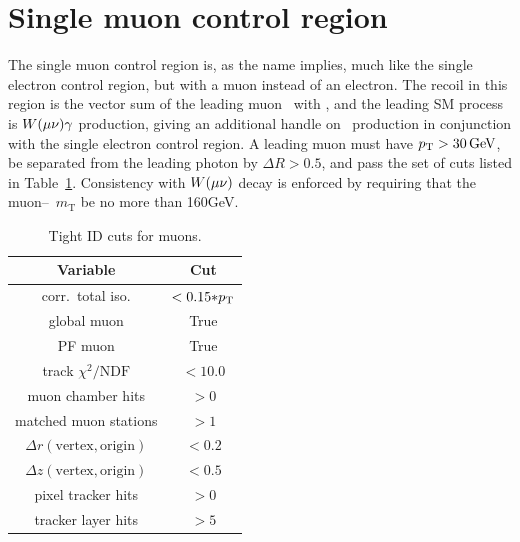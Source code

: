 \section{Single muon control region} \label{sec:event_selection_monomu}
The single muon control region is, as the name implies, much like the single electron control region, but with a muon instead of an electron.
The recoil in this region is the vector sum of the leading muon \pT\ with \vecMET, and the leading SM process is $\PW(\Pmu\Pn)\Pgamma$ production, giving
an additional handle on \wlng\ production in conjunction with the single electron control region.
A leading muon must have $\pT > 30\unit{GeV}$, be separated from the leading photon by $\Delta R > 0.5$, and pass the set of cuts listed in Table~\ref{tab:tightmuonID}.
Consistency with $\PW(\Pmu\Pn)$ decay is enforced by requiring that the muon--\MET\ $m_\mathrm{T}$ be no more than 160\unit{GeV}.

\begin{table}
\centering
\begin{tabular}{ cc }
\hline
Variable & Cut \\
\hline
corr.\ total iso. & $< 0.15{*}\pT$ \\
global muon & True \\
PF muon & True \\
track $\chi^{2}/\mathrm{NDF}$ & $< 10.0$ \\
muon chamber hits & $> 0$ \\
matched muon stations & $> 1$ \\
$\Delta r(\mathrm{vertex}, \mathrm{origin})$ & $< 0.2$ \\
$\Delta z(\mathrm{vertex}, \mathrm{origin})$ & $< 0.5$ \\
pixel tracker hits & $> 0$ \\
tracker layer hits & $> 5$ \\
\hline
\end{tabular}
\caption{Tight ID cuts for muons.}
\label{tab:tightmuonID}
\end{table}

